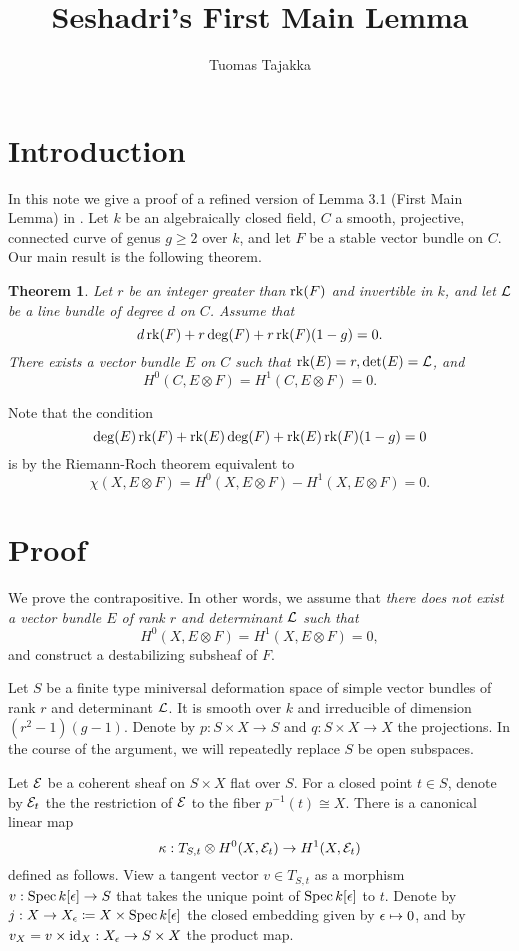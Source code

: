 \documentclass[letterpaper,10pt]{article}
\title{Seshadri's First Main Lemma}
\author{Tuomas Tajakka}
\date{}
\newtheorem{thm}{Theorem}[section]
\theoremstyle{remark}
\begin{document}
\maketitle

\section{Introduction}
In this note we give a proof of a refined version of Lemma 3.1 (First Main Lemma) in \cite{seshadri}. Let $k$ be an algebraically closed field, $C$ a smooth, projective, connected curve of genus $g \ge 2$ over $k$, and let $F$ be a stable vector bundle on $C$. Our main result is the following theorem.

\begin{thm}
    Let $r$ be an integer greater than $\operatorname{\mathrm{rk}}(F)$ and invertible in $k$, and let $\mathcal{L}$ be a line bundle of degree $d$ on $C$. Assume that
    \[ d \operatorname{\mathrm{rk}}(F) + r \deg(F) + r \operatorname{\mathrm{rk}}(F) (1-g) = 0. \]
    There exists a vector bundle $E$ on $C$ such that $\operatorname{\mathrm{rk}}(E) = r, \det(E) = \mathcal{L}$, and 
    \[ H^0(C, E \otimes F) = H^1(C, E \otimes F) = 0. \]
\end{thm}
Note that the condition
\[ \deg(E) \operatorname{\mathrm{rk}}(F) + \operatorname{\mathrm{rk}}(E) \deg(F) + \operatorname{\mathrm{rk}}(E) \operatorname{\mathrm{rk}}(F) (1-g) = 0 \]
is by the Riemann-Roch theorem equivalent to
\[ \chi(X, E \otimes F) = H^0(X, E \otimes F) - H^1(X, E \otimes F) = 0. \]

\section{Proof}
We prove the contrapositive. In other words, we assume that \emph{there does not exist a vector bundle $E$ of rank $r$ and determinant $\mathcal{L}$ such that} 
\[ H^0(X, E \otimes F) = H^1(X, E \otimes F) = 0, \]
and construct a destabilizing subsheaf of $F$.

Let $S$ be a finite type miniversal deformation space of simple vector bundles of rank $r$ and determinant $\mathcal{L}$. It is smooth over $k$ and irreducible of dimension $(r^2 - 1)(g-1)$. Denote by $p: S \times X \to S$ and $q: S \times X \to X$ the projections. In the course of the argument, we will repeatedly replace $S$ be open subspaces.

Let $\mathcal{E}$ be a coherent sheaf on $S \times X$ flat over $S$. For a closed point $t \in S$, denote by $\mathcal{E}_t$ the the restriction of $\mathcal{E}$ to the fiber $p^{-1}(t) \cong X$. There is a canonical linear map
\[ \kappa: T_{S,t} \otimes H^0(X, \mathcal{E}_t) \to H^1(X, \mathcal{E}_t) \]
defined as follows. View a tangent vector $v \in T_{S,t}$ as a morphism $v: \operatorname{\mathrm{Spec}} k[\epsilon] \to S$ that takes the unique point of $\operatorname{\mathrm{Spec}} k[\epsilon]$ to $t$. Denote by $j: X \to X_\epsilon \coloneqq X \times \operatorname{\mathrm{Spec}} k[\epsilon]$ the closed embedding given by $\epsilon \mapsto 0$, and by $v_X = v \times \mathrm{id}_X: X_\epsilon \to S\times X$ the product map.
\end{document}
